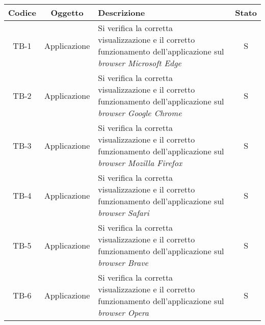 \begin{center}
  \label{tab:test-compatibilita-cross-browser}
  \begin{longtable}{|c|c|p{}|c|}
  \hline
  \textbf{Codice} & \textbf{Oggetto} & \textbf{Descrizione} & \textbf{Stato}\\
  \hline
  TB-1 &Applicazione &Si verifica la corretta visualizzazione e il corretto funzionamento dell'applicazione sul \textit{browser Microsoft Edge} &S \\
  \hline
  TB-2 &Applicazione  &Si verifica la corretta visualizzazione e il corretto funzionamento dell'applicazione  sul \textit{browser Google Chrome} &S \\
  \hline
  TB-3 &Applicazione &Si verifica la corretta visualizzazione e il corretto funzionamento dell'applicazione  sul \textit{browser Mozilla Firefox} &S \\
  \hline
  TB-4 &Applicazione &Si verifica la corretta visualizzazione e il corretto funzionamento dell'applicazione  sul \textit{browser Safari} &S \\
  \hline
  TB-5 &Applicazione &Si verifica la corretta visualizzazione e il corretto funzionamento dell'applicazione  sul \textit{browser Brave} &S \\
  \hline
  TB-6 &Applicazione &Si verifica la corretta visualizzazione e il corretto funzionamento dell'applicazione  sul \textit{browser Opera} &S \\
  \hline
\end{longtable}
\end{center}
